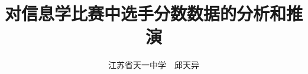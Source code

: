 \documentclass{noithesis}
\title{对信息学比赛中选手分数数据的分析和推演}
\author{江苏省天一中学~~邱天异}
\begin{document}
\newtheorem{definition}{\hspace{2em}定义}[section]
\newtheorem{theorem}{\hspace{2em}定理}[section]
\newtheorem{lemma}{\hspace{2em}引理}[section]
\newtheorem{proposition}{\hspace{2em}命题}[section]
\newtheorem{corollary}{\hspace{2em}推论}[section]

\maketitle


\end{document}
